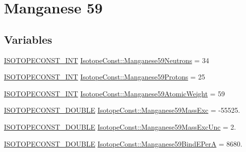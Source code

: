 \hypertarget{group___isotope_const-_manganese-_mn59}{}\section{Manganese 59}
\label{group___isotope_const-_manganese-_mn59}
\subsection*{Variables}
\begin{DoxyCompactItemize}
\item 
\mbox{\hyperlink{group___isotope_const-_macros_ga5f18360b3e99483a35c32d789e62621c}{I\+S\+O\+T\+O\+P\+E\+C\+O\+N\+S\+T\+\_\+\+I\+NT}} \mbox{\hyperlink{group___isotope_const-_manganese-_mn59_ga79721f27a499c601e86bd31223d1fd9f}{Isotope\+Const\+::\+Manganese59\+Neutrons}} = 34
\item 
\mbox{\hyperlink{group___isotope_const-_macros_ga5f18360b3e99483a35c32d789e62621c}{I\+S\+O\+T\+O\+P\+E\+C\+O\+N\+S\+T\+\_\+\+I\+NT}} \mbox{\hyperlink{group___isotope_const-_manganese-_mn59_ga64c767aa5119c6fdddc52ca2874cd412}{Isotope\+Const\+::\+Manganese59\+Protons}} = 25
\item 
\mbox{\hyperlink{group___isotope_const-_macros_ga5f18360b3e99483a35c32d789e62621c}{I\+S\+O\+T\+O\+P\+E\+C\+O\+N\+S\+T\+\_\+\+I\+NT}} \mbox{\hyperlink{group___isotope_const-_manganese-_mn59_ga994c1f8f3f0667b64f2c9efac76330be}{Isotope\+Const\+::\+Manganese59\+Atomic\+Weight}} = 59
\item 
\mbox{\hyperlink{group___isotope_const-_macros_ga8f45a7272ce02c0b4c65c44636ed719a}{I\+S\+O\+T\+O\+P\+E\+C\+O\+N\+S\+T\+\_\+\+D\+O\+U\+B\+LE}} \mbox{\hyperlink{group___isotope_const-_manganese-_mn59_ga9f810a193ff8f744a0e509475e90a811}{Isotope\+Const\+::\+Manganese59\+Mass\+Exc}} = -\/55525.
\item 
\mbox{\hyperlink{group___isotope_const-_macros_ga8f45a7272ce02c0b4c65c44636ed719a}{I\+S\+O\+T\+O\+P\+E\+C\+O\+N\+S\+T\+\_\+\+D\+O\+U\+B\+LE}} \mbox{\hyperlink{group___isotope_const-_manganese-_mn59_ga5f2e11530bda35640e4ef602b3a49bd4}{Isotope\+Const\+::\+Manganese59\+Mass\+Exc\+Unc}} = 2.
\item 
\mbox{\hyperlink{group___isotope_const-_macros_ga8f45a7272ce02c0b4c65c44636ed719a}{I\+S\+O\+T\+O\+P\+E\+C\+O\+N\+S\+T\+\_\+\+D\+O\+U\+B\+LE}} \mbox{\hyperlink{group___isotope_const-_manganese-_mn59_ga09a0972fb09913b1cbbe570664323b90}{Isotope\+Const\+::\+Manganese59\+Bind\+E\+PerA}} = 8680.
\item 

\end{DoxyCompactItemize}
